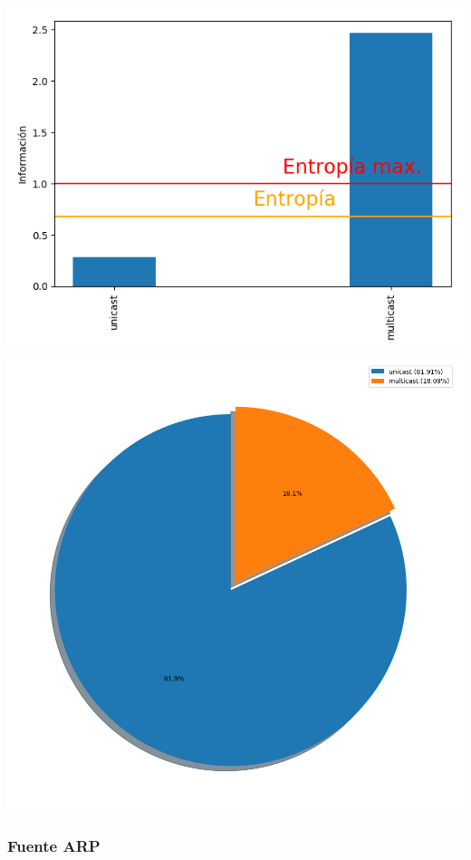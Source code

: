 \hspace*{-1.5cm}
 \includegraphics[scale=0.6]{../plots/trabajo_s1_informacion.png}
 \includegraphics[scale=0.4]{../plots/trabajo_s1_probabilidades.png}

\subsubsection{Fuente ARP}

